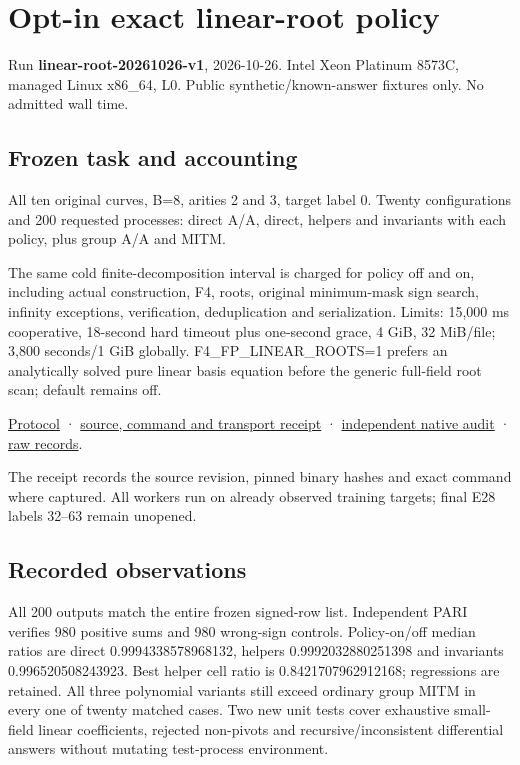 \documentclass[
  10pt,
]{article}
\author{}
\date{}
\begin{document}
\section{Opt-in exact linear-root
policy}\label{opt-in-exact-linear-root-policy}

Run \textbf{linear-root-20261026-v1}, 2026-10-26. Intel Xeon Platinum
8573C, managed Linux x86\_64, L0. Public synthetic/known-answer fixtures
only. No admitted wall time.

\subsection{Frozen task and
accounting}\label{frozen-task-and-accounting}

All ten original curves, B=8, arities 2 and 3, target label 0. Twenty
configurations and 200 requested processes: direct A/A, direct, helpers
and invariants with each policy, plus group A/A and MITM.

The same cold finite-decomposition interval is charged for policy off
and on, including actual construction, F4, roots, original minimum-mask
sign search, infinity exceptions, verification, deduplication and
serialization. Limits: 15,000 ms cooperative, 18-second hard timeout
plus one-second grace, 4 GiB, 32 MiB/file; 3,800 seconds/1 GiB globally.
F4\_FP\_LINEAR\_ROOTS=1 prefers an analytically solved pure linear basis
equation before the generic full-field root scan; default remains off.

\href{../../../execution-v3/LINEAR_ROOT_PROTOCOL_V1.md}{Protocol} ·
\href{../../../execution-v3/runs/linear-root-20261026-v1.transport.json}{source,
command and transport receipt} ·
\href{../../../execution-v3/linear-root-audit-20261026-v1/AUDIT.json}{independent
native audit} ·
\href{../../../execution-v3/runs/linear-root-20261026-v1/RECORDS.json}{raw
records}.

The receipt records the source revision, pinned binary hashes and exact
command where captured. All workers run on already observed training
targets; final E28 labels 32--63 remain unopened.

\subsection{Recorded observations}\label{recorded-observations}

All 200 outputs match the entire frozen signed-row list. Independent
PARI verifies 980 positive sums and 980 wrong-sign controls.
Policy-on/off median ratios are direct 0.9994338578968132, helpers
0.9992032880251398 and invariants 0.996520508243923. Best helper cell
ratio is 0.8421707962912168; regressions are retained. All three
polynomial variants still exceed ordinary group MITM in every one of
twenty matched cases. Two new unit tests cover exhaustive small-field
linear coefficients, rejected non-pivots and recursive/inconsistent
differential answers without mutating test-process environment.
\end{document}
